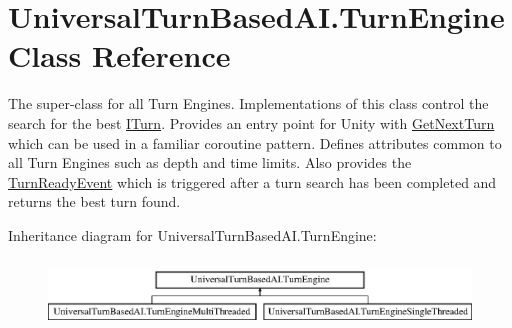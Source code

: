 \hypertarget{class_universal_turn_based_a_i_1_1_turn_engine}{}\section{Universal\+Turn\+Based\+A\+I.\+Turn\+Engine Class Reference}
\label{class_universal_turn_based_a_i_1_1_turn_engine}


The super-\/class for all Turn Engines. Implementations of this class control the search for the best \hyperlink{interface_universal_turn_based_a_i_1_1_i_turn}{I\+Turn}. Provides an entry point for Unity with \hyperlink{class_universal_turn_based_a_i_1_1_turn_engine_ad1a07e70064e2f188b65a783aa49cd8a}{Get\+Next\+Turn} which can be used in a familiar coroutine pattern. Defines attributes common to all Turn Engines such as depth and time limits. Also provides the \hyperlink{class_universal_turn_based_a_i_1_1_turn_engine_af10115494121382d2966a8fc9fe4c9a0}{Turn\+Ready\+Event} which is triggered after a turn search has been completed and returns the best turn found.  


Inheritance diagram for Universal\+Turn\+Based\+A\+I.\+Turn\+Engine\+:\begin{figure}[H]
\begin{center}
\leavevmode
\includegraphics[height=1.842105cm]{class_universal_turn_based_a_i_1_1_turn_engine}
\end{center}
\end{figure}
